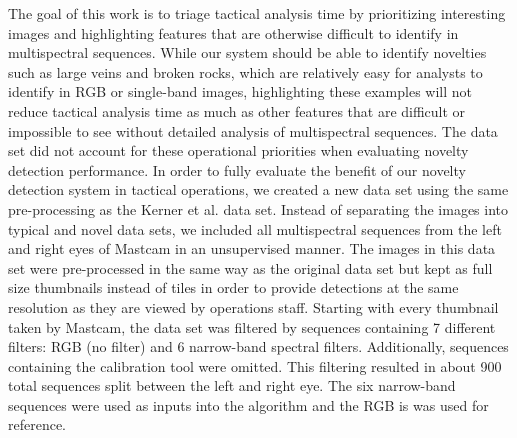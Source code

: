 The goal of this work is to triage tactical analysis time by prioritizing interesting images and highlighting features that are otherwise difficult to identify in multispectral sequences.
While our system should be able to identify novelties such as large veins and broken rocks, which are relatively easy for analysts to identify in RGB or single-band images, highlighting these examples will not reduce tactical analysis time as much as other features that are difficult or impossible to see without detailed analysis of multispectral sequences. 
The \cite{kerner2020comparison} data set did not account for these operational priorities when evaluating novelty detection performance. 
In order to fully evaluate the benefit of our novelty detection system in tactical operations, we created a new data set using the same pre-processing as the Kerner et al. data set. 
Instead of separating the images into typical and novel data sets, we included all multispectral sequences from the left and right eyes of Mastcam in an unsupervised manner.
The images in this data set were pre-processed in the same way as the original data set but kept as full size thumbnails instead of tiles in order to provide detections at the same resolution as they are viewed by operations staff. 
Starting with every thumbnail taken by Mastcam, the data set was filtered by sequences containing 7 different filters: RGB (no filter) and 6 narrow-band spectral filters.
Additionally, sequences containing the calibration tool were omitted. 
This filtering resulted in about 900 total sequences split between the left and right eye. 
The six narrow-band sequences were used as inputs into the algorithm and the RGB is was used for reference.
